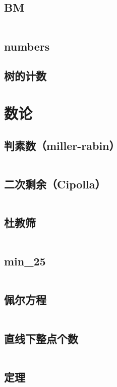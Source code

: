 \documentclass[a4paper,9]{article}
\begin{document}
\subsection{BM}
\inputminted[breaklines]{c++}{source/sequence/bm.cpp}
\subsection{numbers}

\subsection{树的计数}


\section{数论}
\subsection{判素数（miller-rabin）}
\inputminted[breaklines]{c++}{source/number-theory/miller_rabin.cpp}
\subsection{二次剩余（Cipolla）}

\inputminted[breaklines]{c++}{source/number-theory/cipolla.cpp}
\subsection{杜教筛}
\inputminted[breaklines]{c++}{source/number-theory/dujiaoshai.cpp}
\subsection{min\_25}
\inputminted[breaklines]{c++}{source/number-theory/min25.cpp}
\subsection{佩尔方程}
\inputminted[breaklines]{c++}{source/number-theory/pell.cpp}
\subsection{直线下整点个数}
\inputminted[breaklines]{c++}{source/number-theory/lattice_count.cpp}
\subsection{定理}

\end{document}
